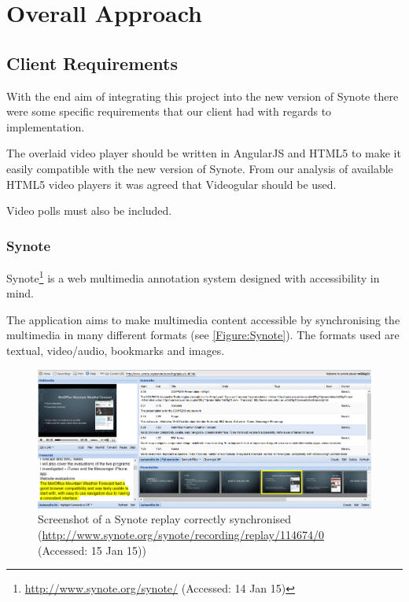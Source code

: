 \chapter{Overall Approach} 
\label{Chapter:Overall Approach}
\section{Client Requirements}
With the end aim of integrating this project into the new version of Synote there were some specific requirements that our client had with regards to implementation.

The overlaid video player should be written in AngularJS and HTML5 to make it easily compatible with the new version of Synote. From our analysis of available HTML5 video players it was agreed that \gls{Videogular} should be used.

Video polls must also be included.

\subsection{Synote}
\label{Section:Synote}
Synote\footnote{\url{http://www.synote.org/synote/} (Accessed: 14 Jan 15)} is a web multimedia annotation system designed with accessibility in mind. 

The application aims to make multimedia content accessible by synchronising the multimedia in many different formats (see \autoref{Figure:Synote}). The formats used are textual, video/audio, bookmarks and images. 

\begin{figure}[h!]
	\centering 
		\includegraphics[scale=0.4]{../figures/synote_sync.png} 		
	\caption{\label{Figure:Synote} Screenshot of a Synote replay correctly synchronised (\url{http://www.synote.org/synote/recording/replay/114674/0} (Accessed: 15 Jan 15))}
\end{figure}

